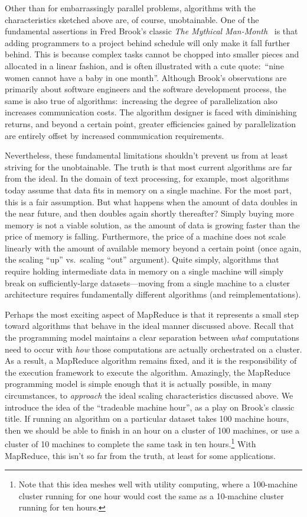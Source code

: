 Other than for embarrassingly parallel problems, algorithms with the
characteristics sketched above are, of course, unobtainable.  One of
the fundamental assertions in Fred Brook's classic {\it The Mythical
  Man-Month}~\cite{Brooks_1995} is that adding programmers to a
project behind schedule will only make it fall further behind.  This
is because complex tasks cannot be chopped into smaller pieces and
allocated in a linear fashion, and is often illustrated with a cute
quote:\ ``nine women cannot have a baby in one month''.  Although
Brook's observations are primarily about software engineers and the
software development process, the same is also true of
algorithms:\ increasing the degree of parallelization also increases
communication costs.  The algorithm designer is faced with diminishing
returns, and beyond a certain point, greater efficiencies gained by
parallelization are entirely offset by increased communication
requirements.

Nevertheless, these fundamental limitations shouldn't prevent us from
at least striving for the unobtainable.  The truth is that most
current algorithms are far from the ideal.  In the domain of text
processing, for example, most algorithms today assume that data fits
in memory on a single machine.  For the most part, this is a fair
assumption.  But what happens when the amount of data doubles in the
near future, and then doubles again shortly thereafter?  Simply buying
more memory is not a viable solution, as the amount of data is growing
faster than the price of memory is falling.  Furthermore, the price of
a machine does not scale linearly with the amount of available memory
beyond a certain point (once again, the scaling ``up'' vs.\ scaling
``out'' argument).  Quite simply, algorithms that require holding
intermediate data in memory on a single machine will simply break on
sufficiently-large datasets---moving from a single machine to a
cluster architecture requires fundamentally different algorithms (and
reimplementations).

Perhaps the most exciting aspect of MapReduce is that it represents a
small step toward algorithms that behave in the ideal manner discussed
above.  Recall that the programming model maintains a clear separation
between {\it what} computations need to occur with {\it how} those
computations are actually orchestrated on a cluster.  As a result, a
MapReduce algorithm remains fixed, and it is the responsibility of the
execution framework to execute the algorithm.  Amazingly, the
MapReduce programming model is simple enough that it is actually
possible, in many circumstances, to {\it approach} the ideal scaling
characteristics discussed above.  We introduce the idea of the
``tradeable machine hour'', as a play on Brook's classic title.  If
running an algorithm on a particular dataset takes 100 machine hours,
then we should be able to finish in an hour on a cluster of 100
machines, or use a cluster of 10 machines to complete the same task in
ten hours.\footnote{Note that this idea meshes well with utility
  computing, where a 100-machine cluster running for one hour would
  cost the same as a 10-machine cluster running for ten hours.} With
MapReduce, this isn't so far from the truth, at least for some
applications.

